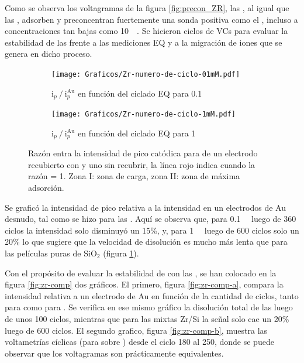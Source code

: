 		 Como se observa los voltagramas de la figura \ref{fig:precon_ZR}, las \pdmZ, al igual que las \pdmF, adsorben y preconcentran fuertemente una sonda positiva como el \ru,	incluso a concentraciones tan bajas como \SI{10}{\micro\Molar}. Se hicieron ciclos de VCs para evaluar la estabilidad de las \pdmZ\space frente a las mediciones EQ y a la migración de iones que se genera en dicho proceso. 

		 			\begin{figure}[h!]
		 			\vspace*{-6mm}
			   	    \begin{subfigure}[t]{0.495\textwidth}
			        	\texttt{[image: Graficos/Zr-numero-de-ciclo-01mM.pdf]}
			        	\vspace*{-10mm}\caption{$\text{i}_p\mathbin{/}\text{i}_p^{\text{Au}}$ en función del ciclado EQ para \ru\space \SI{0.1}{\milli\Molar}}
			         	\end{subfigure}
			     		 \begin{subfigure}[t]{0.495\textwidth}
			        	\texttt{[image: Graficos/Zr-numero-de-ciclo-1mM.pdf]}
			        	\vspace*{-10mm}\caption{$\text{i}_p\mathbin{/}\text{i}_p^{\text{Au}}$ en función del ciclado EQ para \ru\space \SI{1}{\milli\Molar}}
			         	\end{subfigure}
			         	\caption[Intensidad en función del ciclado EQ para \pdmZ]{Razón entra la intensidad de pico catódica para \ru\space de un electrodo recubierto con \pdmZ\space y uno sin recubrir, la línea rojo indica cuando la razón = 1. Zona I: zona de carga, zona II: zona de máxima adsorción.}
			         	\label{fig:ventana-zr}
			         	\vspace{3mm}
			     	\end{figure}

		 Se graficó la intensidad de pico relativa a la intensidad en un electrodos de Au desnudo, tal como se hizo para las \pdmF. Aquí se observa que, para \ru\space \SI{0.1}{\milli\Molar} luego de 360 ciclos la intensidad solo disminuyó un 15\%, y, para \ru\space \SI{1}{\milli\Molar} luego de 600 ciclos solo un 20\%  lo que sugiere que la velocidad de disolución es mucho más lenta que para las películas puras de SiO$_2$ (figura \ref{fig:ventana-zr}).
			     		
		 Con el propósito de evaluar la estabilidad de \pdmZ\space con las \pdmF, se han colocado en la figura \ref{fig:zr-comp} dos gráficos. El primero, figura \ref{fig:zr-comp-a}, compara la intensidad relativa a un electrodo de Au en función de la cantidad de ciclos, tanto para \pdmZ\space como para \pdmF. Se verifica en ese mismo gráfico la disolución total de las \pdmF\space luego de unos 100 ciclos, mientras que para las mixtas Zr/Si la señal solo cae un 20\% luego de 600 ciclos. El segundo grafico, figura \ref{fig:zr-comp-b}, muestra las voltametrías cíclicas (para \ru\space sobre \pdmZ) desde el ciclo 180 al 250, donde se puede observar que los voltagramas son prácticamente equivalentes.

